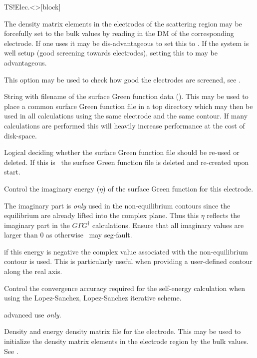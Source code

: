 \begin{fdfentry}{TS!Elec.<>}[block]
\begin{fdfoptions}
    The density matrix elements in the electrodes of the scattering
    region may be forcefully set to the bulk values by reading in the
    DM of the corresponding electrode. If one uses
     it may be dis-advantageous to set this
    to .
    If the system is well setup (good screening towards electrodes),
    setting this to  may be advantageous.

    This option may be used to check how good the electrodes are
    screened, see .

    \option[Gf]%
    String with filename of the surface Green function data
    (). This may be used to place a common surface
    Green function file in a top directory which may then be used in
    all calculations using the same electrode and the same contour.
    If many calculations are performed this will heavily increase
    performance at the cost of disk-space.

    \option[Gf-Reuse]%
    Logical deciding whether the surface Green function file should be
    re-used or deleted.
    If this is \fdffalse\ the surface Green function file is deleted
    and re-created upon start.
    
    \option[Eta]%
    Control the imaginary energy ($\eta$) of the surface Green
    function for this electrode.

    The imaginary part is \emph{only} used in the non-equilibrium
    contours since the equilibrium are already lifted into the complex
    plane. Thus this $\eta$ reflects the imaginary part in the
    $G\Gamma G^\dagger$ calculations. Ensure that all imaginary values
    are larger than $0$ as otherwise \tsiesta\ may seg-fault.

    \note if this energy is negative the complex value associated with
    the non-equilibrium contour is used. This is particularly useful
    when providing a user-defined contour along the real axis.

    \option[Accuracy]%
    Control the convergence accuracy required for the self-energy
    calculation when using the Lopez-Sanchez, Lopez-Sanchez iterative
    scheme. 

    \note advanced use \emph{only}.
    
    \option[DE]%
    Density and energy density matrix file for the electrode. This may
    be used to initialize the density matrix elements in the electrode
    region by the bulk values. See .


\end{fdfoptions}
\end{fdfentry}
